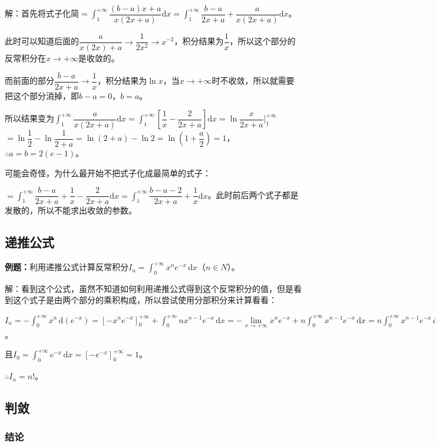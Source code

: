 \documentclass[UTF8, 12pt]{ctexart}
\begin{document}
解：首先将式子化简$=\displaystyle{\int_1^{+\infty}\dfrac{(b-a)x+a}{x(2x+a)}\textrm{d}x=\int_1^{+\infty}\dfrac{b-a}{2x+a}+\dfrac{a}{x(2x+a)}\textrm{d}x}$。

此时可以知道后面的$\dfrac{a}{x(2x)+a}\to\dfrac{1}{2x^2}\to x^{-2}$，积分结果为$\dfrac{1}{x}$，所以这个部分的反常积分在$x\to+\infty$是收敛的。

而前面的部分$\dfrac{b-a}{2x+a}\to\dfrac{1}{x}$，积分结果为$\ln x$，当$x\to+\infty$时不收敛，所以就需要把这个部分消掉，即$b-a=0$，$b=a$。

所以结果变为$\displaystyle{\int_1^{+\infty}\dfrac{a}{x(2x+a)}\textrm{d}x=\int_1^{+\infty}\left[\dfrac{1}{x}-\dfrac{2}{2x+a}\right]\textrm{d}x}=\ln\dfrac{x}{2x+a}\bigg\vert_1^{+\infty}$\\$=\ln\dfrac{1}{2}-\ln\dfrac{1}{2+a}=\ln(2+a)-\ln2=\ln\left(1+\dfrac{a}{2}\right)=1$，$\therefore a=b=2(e-1)$。

可能会奇怪，为什么最开始不把式子化成最简单的式子：

$=\displaystyle{\int_1^{+\infty}\dfrac{b-a}{2x+a}+\dfrac{1}{x}-\dfrac{2}{2x+a}\textrm{d}x=\int_1^{+\infty}\dfrac{b-a-2}{2x+a}+\dfrac{1}{x}\textrm{d}x}$。此时前后两个式子都是发散的，所以不能求出收敛的参数。

\subsection{递推公式}

\textbf{例题：}利用递推公式计算反常积分$I_n=\int_0^{+\infty}x^ne^{-x}\,\textrm{d}x$（$n\in N$）。

解：看到这个公式，虽然不知道如何利用递推公式得到这个反常积分的值，但是看到这个式子是由两个部分的乘积构成，所以尝试使用分部积分来计算看看：

$I_n=-\int_0^{+\infty}x^n\,\textrm{d}(e^{-x})=[-x^ne^{-x}]_0^{+\infty}+\int_0^{+\infty}nx^{n-1}e^{-x}\,\textrm{d}x=-\lim\limits_{x\to+\infty}x^ne^{-x}+n\int_0^{+\infty}x^{n-1}e^{-x}\,\textrm{d}x=n\int_0^{+\infty}x^{n-1}e^{-x}\,\textrm{d}x=nI_{n-1}$。

且$I_0=\int_0^{+\infty}e^{-x}\,\textrm{d}x=[-e^{-x}]_0^{+\infty}=1$。

$\therefore I_n=n!$。

\subsection{判敛}

\subsubsection{结论}
\end{document}
